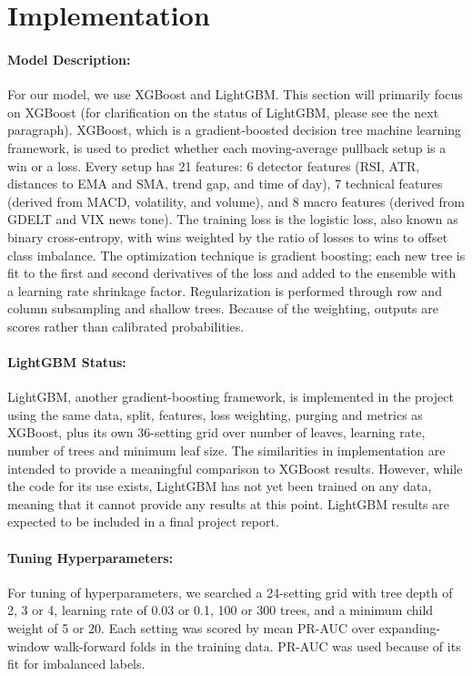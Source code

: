 \documentclass[11pt]{article}
\begin{document}
\section{Implementation}

\paragraph{Model Description:} For our model, we use XGBoost and LightGBM. This section will primarily focus on XGBoost (for clarification on the status of LightGBM, please see the next paragraph). XGBoost, which is a gradient-boosted decision tree machine learning framework, is used to predict whether each moving-average pullback setup is a win or a loss. Every setup has 21 features: 6 detector features (RSI, ATR, distances to EMA and SMA, trend gap, and time of day), 7 technical features (derived from MACD, volatility, and volume), and 8 macro features (derived from GDELT and VIX news tone). The training loss is the logistic loss, also known as binary cross-entropy, with wins weighted by the ratio of losses to wins to offset class imbalance. The optimization technique is gradient boosting; each new tree is fit to the first and second derivatives of the loss and added to the ensemble with a learning rate shrinkage factor. Regularization is performed through row and column subsampling and shallow trees. Because of the weighting, outputs are scores rather than calibrated probabilities.

\paragraph{LightGBM Status:} LightGBM, another gradient-boosting framework, is implemented in the project using the same data, split, features, loss weighting, purging and metrics as XGBoost, plus its own 36-setting grid over number of leaves, learning rate, number of trees and minimum leaf size. The similarities in implementation are intended to provide a meaningful comparison to XGBoost results. However, while the code for its use exists, LightGBM has not yet been trained on any data, meaning that it cannot provide any results at this point. LightGBM results are expected to be included in a final project report.

\paragraph{Tuning Hyperparameters:} For tuning  of hyperparameters, we searched a 24-setting grid with tree depth of 2, 3 or 4, learning rate of 0.03 or 0.1, 100 or 300 trees, and a minimum child weight of 5 or 20. Each setting was scored by mean PR-AUC over expanding-window walk-forward folds in the training data. PR-AUC was used because of its fit for imbalanced labels.
\end{document}
